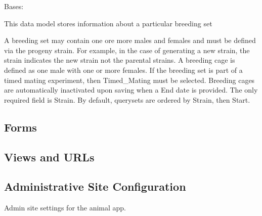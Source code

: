 \documentclass[letterpaper,10pt,english]{sphinxmanual}
\begin{document}

\begin{fulllineitems}
\label{api:animal.models.Breeding}
Bases: 


This data model stores information about a particular breeding set


A breeding set may contain one ore more males and females and must be defined via the progeny strain.  For example, in the case of generating a new strain, the strain indicates the new strain not the parental strains.  A breeding cage is defined as one male with one or more females.  If the breeding set is part of a timed mating experiment, then Timed\_Mating must be selected.  Breeding cages are automatically inactivated upon saving when a End date is provided.  The only required field is Strain.  By default, querysets are ordered by Strain, then Start.


\end{fulllineitems}



\subsection{Forms}
\label{api:id2}

\subsection{Views and URLs}
\label{api:id3}\label{api:module-animal.urls}

\subsection{Administrative Site Configuration}
\label{api:id4}\label{api:module-animal.admin}
Admin site settings for the animal app.

\end{document}
